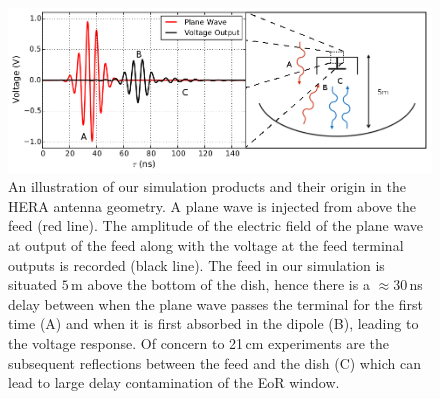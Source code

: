 \documentclass[onecolumn]{emulateapj}
\begin{document}
\begin{figure}
\includegraphics[width=\textwidth]{figures/SimulationIllustration.png}
\caption{An illustration of our simulation products and their origin in the HERA antenna geometry. A plane wave is injected from above the feed (red line). The amplitude of the electric field of the plane wave at output of the feed along with the voltage at the feed terminal outputs is recorded (black line). The feed in our simulation is situated $5$\,m above the bottom of the dish, hence there is a $\approx 30$\,ns delay between when the plane wave passes the terminal for the first time (A) and when it is first absorbed in the dipole (B), leading to the voltage response. Of concern to 21\,cm experiments are the subsequent reflections between the feed and the dish (C) which can lead to large delay contamination of the EoR window.}
\label{fig:Simulation}
\end{figure}
\end{document}
